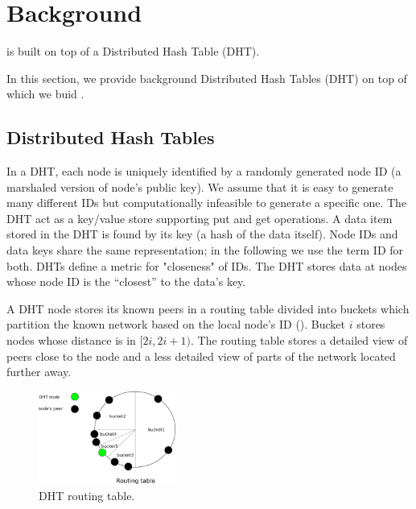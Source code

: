 \section{Background}
\label{sec:background}
\sysname is built on top of a Distributed Hash Table (DHT). 

In this section, we provide background Distributed Hash Tables (DHT) on top of which we buid \sysname. 

\subsection{Distributed Hash Tables}
In a DHT, each node is uniquely identified by a randomly generated node ID (\eg a marshaled version of node's public key). We assume that it is easy to generate many different IDs but computationally infeasible to generate a specific one. The DHT act as a key/value store supporting put and get operations. A data item stored in the DHT is found by its key (\eg a hash of the data itself). Node IDs and data keys share the same representation; in the following we use the term ID for both. DHTs define a metric for "closeness" of IDs. The DHT stores data at nodes whose node ID is the “closest” to the data’s key. 

A DHT node stores its known peers in a routing table divided into buckets which partition the known network based on the local node’s ID (). Bucket $i$ stores nodes whose distance is in $[2i, 2i+1)$. The routing table stores a detailed view of peers close to the node and a less detailed view of parts of the network located further away.


\begin{figure}
    \includegraphics[width=0.4\textwidth]{img/kademlia}
    \caption{DHT routing table.}
    \label{fig:kademlia}
 \end{figure}
 
